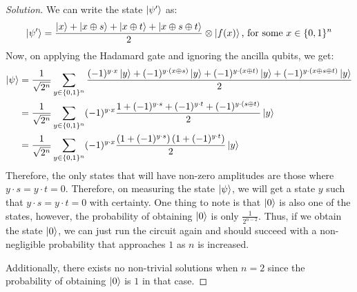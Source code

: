 \begin{solution}[label=ques:3]
\begin{proof}[Solution]
    We can write the state $\ket{\psi'}$ as:
    \begin{equation}
      \ket{\psi'} = \frac{\ket{x} + \ket{x \oplus s} + \ket{x \oplus t} + \ket{x \oplus s \oplus t}}{2}\otimes \ket{f(x)}\text{, for some } x \in \{0, 1\}^n
      \label{eq:simonpsi}
    \end{equation}
    Now, on applying the Hadamard gate and ignoring the ancilla qubits, we get:
    \begin{equation}
      \begin{split}
        \ket{\psi} &= \frac{1}{\sqrt{2^n}}\sum_{y\in\{0, 1\}^n}\frac{(-1)^{y\cdot x}\ket{y} + (-1)^{y\cdot(x \oplus s)}\ket{y} + (-1)^{y\cdot(x \oplus t)}\ket{y} + (-1)^{y\cdot(x \oplus s \oplus t)}\ket{y}}{2}\\
        &= \frac{1}{\sqrt{2^n}}\sum_{y\in\{0, 1\}^n}(-1)^{y\cdot x}\frac{1 + (-1)^{y\cdot s} + (-1)^{y\cdot t} + (-1)^{y\cdot (s \oplus t)}}{2}\ket{y}\\
        &= \frac{1}{\sqrt{2^n}}\sum_{y\in\{0, 1\}^n}(-1)^{y\cdot x}\frac{\left(1 + (-1)^{y\cdot s}\right)\left(1 + (-1)^{y\cdot t}\right)}{2}\ket{y}
      \end{split}
      \label{eq:simonfinal}
    \end{equation}
    Therefore, the only states that will have non-zero amplitudes are those where $y\cdot s = y\cdot t = 0$. Therefore, on measuring the state $\ket{\psi}$, we will get a state $y$ such that $y\cdot s = y\cdot t = 0$ with certainty. One thing to note is that $\ket{0}$ is also one of the states, however, the probability of obtaining $\ket{0}$ is only $\frac{1}{2^{n - 2}}$. Thus, if we obtain the state $\ket{0}$, we can just run the circuit again and should succeed with a non-negligible probability that approaches $1$ as $n$ is increased.\par
    Additionally, there exists no non-trivial solutions when $n = 2$ since the probability of obtaining $\ket{0}$ is $1$ in that case.
  \end{proof}
\end{solution}
